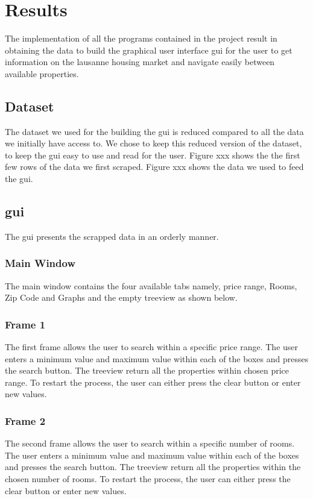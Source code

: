 \documentclass[main]{subfiles}
\begin{document}
\section{Results}
The implementation of all the programs contained in the project result in obtaining the data to build the graphical user interface \ac{gui} 
for the user to get information on the lausanne housing market and navigate easily between available properties.

\subsection{Dataset}
The dataset we used for the building the \ac{gui} is reduced compared to all the data we initially have access to. 
We chose to keep this reduced version of the dataset, to keep the \ac{gui} easy to use and read for the user. 
Figure xxx shows the the first few rows of the data we first scraped. 
Figure xxx shows the data we used to feed the \ac{gui}.


\subsection{\ac{gui}}
The \ac{gui} presents the scrapped data in an orderly manner.
\subsubsection{Main Window}
The main window contains the four available tabs namely, price range, Rooms, Zip Code and Graphs and the empty treeview as shown below.

\subsubsection{Frame 1}
The first frame allows the user to search within a specific price range. 
The user enters a minimum value and maximum value within each of the boxes and presses the search button. 
The treeview return all the properties within chosen price range. 
To restart the process, the user can either press the clear button or enter new values.

\subsubsection{Frame 2}
The second frame allows the user to search within a specific number of rooms. 
The user enters a minimum value and maximum value within each of the boxes and presses the search button. 
The treeview return all the properties within the chosen number of rooms. 
To restart the process, the user can either press the clear button or enter new values.
\end{document}
